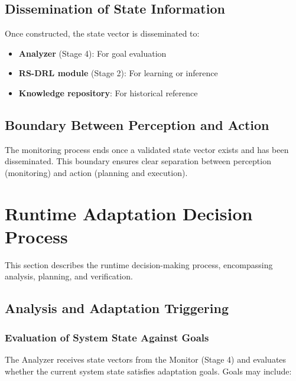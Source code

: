 \documentclass[11pt,a4paper]{article}
\begin{document}
\subsection{Dissemination of State Information}

Once constructed, the state vector is disseminated to:

\begin{itemize}
    \item \textbf{Analyzer} (Stage 4): For goal evaluation
    \item \textbf{RS-DRL module} (Stage 2): For learning or inference
    \item \textbf{Knowledge repository}: For historical reference
\end{itemize}

\subsection{Boundary Between Perception and Action}

The monitoring process ends once a validated state vector exists and has been disseminated. This boundary ensures clear separation between perception (monitoring) and action (planning and execution).


\section{Runtime Adaptation Decision Process}
\label{sec:decision-process}

This section describes the runtime decision-making process, encompassing analysis, planning, and verification.

\subsection{Analysis and Adaptation Triggering}

\subsubsection{Evaluation of System State Against Goals}

The Analyzer receives state vectors from the Monitor (Stage 4) and evaluates whether the current system state satisfies adaptation goals. Goals may include:
\end{document}
